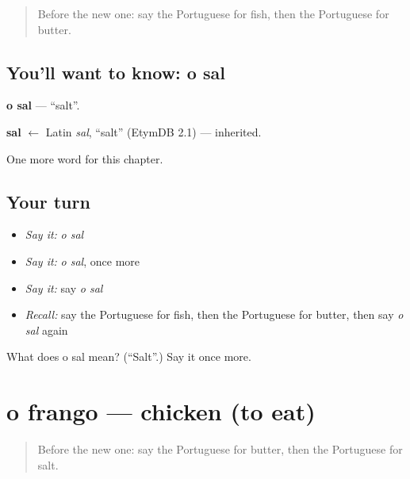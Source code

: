 \label{lesson:PT-C44-sal}



\begin{quote}
Before the new one: say the Portuguese for fish, then the Portuguese for butter.
\end{quote}

\subsection*{You'll want to know: o sal}
\textbf{o sal} — \textquotedblleft{}salt\textquotedblright{}.

\begin{cousinweb}
\textbf{sal} $\leftarrow$ Latin \emph{sal}, \textquotedblleft{}salt\textquotedblright{} (EtymDB 2.1) — inherited.
\end{cousinweb}

\begin{grammarlens}[title={What you've built}]
One more word for this chapter.
\end{grammarlens}

\subsection*{Your turn}
\begin{itemize}
\raggedright
  \item \emph{Say it:} \emph{o sal}
  \item \emph{Say it:} \emph{o sal}, once more
  \item \emph{Say it:} say \emph{o sal}
  \item \emph{Recall:} say the Portuguese for fish, then the Portuguese for butter, then say \emph{o sal} again
\end{itemize}

\begin{tcolorbox}[breakable,colback=teal!4,colframe=teal!35!black,title={Before you move on}]
What does o sal mean? (\textquotedblleft{}Salt\textquotedblright{}.) Say it once more.
\end{tcolorbox}
\section[o frango]{o frango — chicken (to eat)}

\label{lesson:PT-C44-frango}



\begin{quote}
Before the new one: say the Portuguese for butter, then the Portuguese for salt.
\end{quote}

